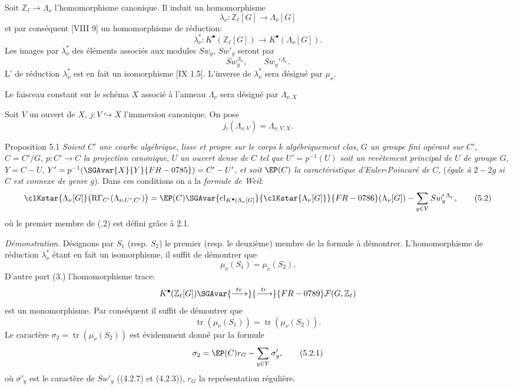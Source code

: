 Soit $\mathbb{Z}_\ell\to\Lambda_\nu$ l'homomorphisme canonique. Il induit un homomorphisme
\[
\lambda_\nu:\mathbb{Z}_\ell[G]\longrightarrow \Lambda_\nu[G]
\]
et par conséquent [VIII 9] un homomorphisme de réduction:
\[
\lambda_\nu^*:K^{\bullet}(\mathbb{Z}_\ell[G])\longrightarrow K^{\bullet}(\Lambda_\nu[G]).
\]
Les images par $\lambda_\nu^*$ des éléments associés aux modules $Sw_y$, $Sw'_y$ seront  par
\[
Sw_y^{\Lambda_\nu},\qquad Sw_y'{}^{\Lambda_\nu}.
\]
L' de réduction $\lambda_\nu^*$ est en fait un isomorphisme [IX 1.5]. L'inverse de $\lambda_\nu^*$ sera désigné par $\mu_\nu$.

Le faisceau constant sur le schéma $X$ associé à l'anneau $\Lambda_\nu$ sera désigné par $\Lambda_{\nu,X}$

Soit $V$ un ouvert de $X$, $j:V\hookrightarrow X$ l'immersion canonique. On pose
\[
j_!(\Lambda_{\nu,V})=\Lambda_{\nu,V,X}.
\]

\begin{statement}{Proposition 5.1}
\emph{Soient} $C'$ \emph{une courbe algébrique}, \emph{lisse et propre sur le corps} $k$ \emph{algébriquement clos}, $G$ \emph{un groupe fini opérant sur} $C'$, $C=C'/G$, $p:C'\to C$ \emph{la projection canonique}, $U$ \emph{un ouvert dense de} $C$ \emph{tel que} $U'=p^{-1}(U)$ \emph{soit un revêtement principal de} $U$ \emph{de groupe} $G$, $Y=C-U$, $Y'=p^{-1}(\SGAvar{X}{Y}{FR-0785})=C'-U'$, \emph{et soit} $\EP(C)$ \emph{la caractéristique d'Euler-Poincaré de} $C$, (\emph{égale à} $2-2g$ \emph{si} $C$ \emph{est connexe de genre} $g$).
Dans ces conditions on a la \emph{formule de Weil}:
\[
\clKstar{\Lambda_\nu[G]}\bigl(\mathrm{R}\Gamma_{C'}(\Lambda_{\nu,U',C'})\bigr)
=
\EP(C)\SGAvar{\operatorname{cl}_{K^{\bullet}(\Lambda_\nu[G]}}{\clKstar{\Lambda_\nu[G]}}{FR-0786}(\Lambda_\nu[G])
-\sum_{y\in Y}Sw_y'{}^{\Lambda_\nu},
\tag{5.2}
\]
où le premier membre de (.2) est défini grâce à 2.1.
\end{statement}

\emph{Démonstration}. Désignons par $S_1$ (resp. $S_2$) le premier (resp. le deuxième) membre de la formule à démontrer. L'homomorphisme de réduction $\lambda_\nu^*$ étant en fait un isomorphisme, il suffit de démontrer que
\[
\mu_\nu(S_1)=\mu_\nu(S_2).
\]
D'autre part (3.) l'homomorphisme trace:
\[
K^{\bullet}(\mathbb{Z}_\ell[G])\SGAvar{\xrightarrow{\ tv\ }}{\xrightarrow{\ tr\ }}{FR-0789}\mathcal{F}(G,\mathbb{Z}_\ell)
\]
est un monomorphisme. Par conséquent il suffit de démontrer que
\[
\operatorname{tr}(\mu_\nu(S_1))=\operatorname{tr}(\mu_\nu(S_2)).
\]
Le caractère $\sigma_2=\operatorname{tr}(\mu_\nu(S_2))$ est évidemment donné par la
formule
\[
\sigma_2=\EP(C)r_G-\sum_{y\in Y}\sigma'_y,
\tag{5.2.1}
\]
où $\sigma'_y$ est le caractère de $Sw'_y$ ((4.2.7) et (4.2.3)), $r_G$ la représentation régulière.

